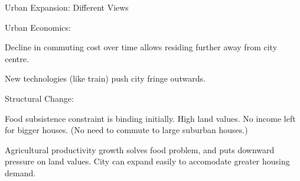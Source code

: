 \documentclass[aspectratio=169]{beamer}
\begin{document}

\begin{frame}{Urban Expansion: Different Views}

\begin{widee}

\item Urban Economics:
\begin{midi}
\item Decline in commuting cost over time allows residing further away from city centre.
\item New technologies (like train) push city fringe outwards.
\end{midi}

\pause

\item Structural Change: 
\begin{midi}
\item Food subsistence constraint is binding initially. High land values. No income left for bigger houses. (No need to commute to large suburban houses.)
\item Agricultural productivity growth solves food problem, and puts downward pressure on land values. City can expand easily to accomodate greater housing demand.
\end{midi}

\end{widee}

\end{frame}
\end{document}
